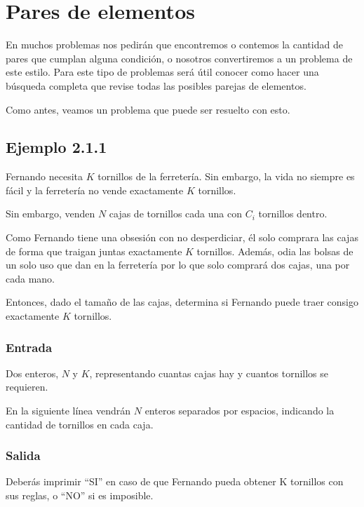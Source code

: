 \chapter*{Pares de elementos}

En muchos problemas nos pedirán que encontremos o contemos la cantidad de pares que cumplan alguna condición, o nosotros convertiremos a un problema de este estilo. Para este tipo de problemas será útil conocer como hacer una búsqueda completa que revise todas las posibles parejas de elementos.

Como antes, veamos un problema que puede ser resuelto con esto.

\section*{Ejemplo 2.1.1}

Fernando necesita \(K\) tornillos de la ferretería. Sin embargo, la vida no siempre es fácil y la ferretería no vende exactamente \(K\) tornillos.

Sin embargo, venden \(N\) cajas de tornillos cada una con \(C_i\) tornillos dentro. 

Como Fernando tiene una obsesión con no desperdiciar, él solo comprara las cajas de forma que traigan juntas exactamente \(K\) tornillos. Además, odia las bolsas de un solo uso que dan en la ferretería por lo que solo comprará dos cajas, una por cada mano.

Entonces, dado el tamaño de las cajas, determina si Fernando puede traer consigo exactamente \(K\) tornillos.

\subsection*{Entrada}
Dos enteros, \(N\) y \(K\), representando cuantas cajas hay y cuantos tornillos se requieren.

En la siguiente línea vendrán \(N\) enteros separados por espacios, indicando la cantidad de tornillos en cada caja.

\subsection*{Salida}
Deberás imprimir “SI” en caso de que Fernando pueda obtener K tornillos con sus reglas, o “NO” si es imposible.

